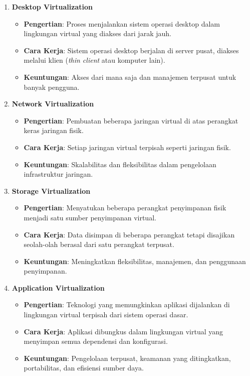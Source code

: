 \documentclass[12pt]{article}
\begin{document}
\begin{enumerate}
    \item \textbf{Desktop Virtualization}
    \begin{itemize}
        \item \textbf{Pengertian}: Proses menjalankan sistem operasi desktop dalam lingkungan virtual yang diakses dari jarak jauh.
        \item \textbf{Cara Kerja}: Sistem operasi desktop berjalan di server pusat, diakses melalui klien (\textit{thin client} atau komputer lain).
        \item \textbf{Keuntungan}: Akses dari mana saja dan manajemen terpusat untuk banyak pengguna.
    \end{itemize}

    \item \textbf{Network Virtualization}
    \begin{itemize}
        \item \textbf{Pengertian}: Pembuatan beberapa jaringan virtual di atas perangkat keras jaringan fisik.
        \item \textbf{Cara Kerja}: Setiap jaringan virtual terpisah seperti jaringan fisik.
        \item \textbf{Keuntungan}: Skalabilitas dan fleksibilitas dalam pengelolaan infrastruktur jaringan.
    \end{itemize}

    \item \textbf{Storage Virtualization}
    \begin{itemize}
        \item \textbf{Pengertian}: Menyatukan beberapa perangkat penyimpanan fisik menjadi satu sumber penyimpanan virtual.
        \item \textbf{Cara Kerja}: Data disimpan di beberapa perangkat tetapi disajikan seolah-olah berasal dari satu perangkat terpusat.
        \item \textbf{Keuntungan}: Meningkatkan fleksibilitas, manajemen, dan penggunaan penyimpanan.
    \end{itemize}

    \item \textbf{Application Virtualization}
    \begin{itemize}
        \item \textbf{Pengertian}: Teknologi yang memungkinkan aplikasi dijalankan di lingkungan virtual terpisah dari sistem operasi dasar.
        \item \textbf{Cara Kerja}: Aplikasi dibungkus dalam lingkungan virtual yang menyimpan semua dependensi dan konfigurasi.
        \item \textbf{Keuntungan}: Pengelolaan terpusat, keamanan yang ditingkatkan, portabilitas, dan efisiensi sumber daya.
    \end{itemize}
\end{enumerate}
\end{document}
